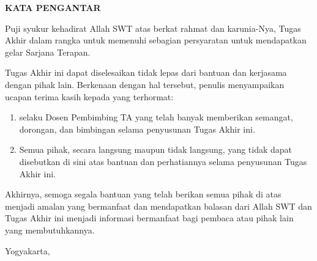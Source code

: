 \clearpage
{}
{}
\begin{center}
    \textbf{\large KATA PENGANTAR}\\[3em]
\end{center}

Puji syukur kehadirat Allah SWT atas berkat rahmat dan karunia-Nya, Tugas Akhir dalam rangka untuk memenuhi sebagian persyaratan untuk mendapatkan gelar Sarjana Terapan.

Tugas Akhir ini dapat diselesaikan tidak lepas dari bantuan dan kerjasama dengan pihak lain. Berkenaan dengan hal tersebut, penulis menyampaikan ucapan terima kasih kepada yang terhormat:

\begin{enumerate}
    \item {\pembimbing} selaku Dosen Pembimbing TA yang telah banyak memberikan semangat, dorongan, dan bimbingan selama penyusunan Tugas Akhir ini.
    \item Semua pihak, secara langsung maupun tidak langsung, yang tidak dapat disebutkan di sini atas bantuan dan perhatiannya selama penyusunan Tugas Akhir ini.
\end{enumerate}

Akhirnya, semoga segala bantuan yang telah berikan semua pihak di atas menjadi amalan yang bermanfaat dan mendapatkan balasan dari Allah SWT dan Tugas Akhir ini menjadi informasi bermanfaat bagi pembaca atau pihak lain yang membutuhkannya.

\begin{flushright}
    Yogyakarta, \tglpengesahan\\[1.25cm]
    \penulis \\
    \nim
\end{flushright}